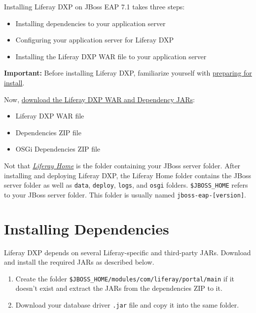 Installing Liferay DXP on JBoss EAP 7.1 takes three steps:

\begin{itemize}
\tightlist
\item
  Installing dependencies to your application server
\item
  Configuring your application server for Liferay DXP
\item
  Installing the Liferay DXP WAR file to your application server
\end{itemize}

\noindent\hrulefill

\textbf{Important:} Before installing Liferay DXP, familiarize yourself
with
\href{/docs/7-2/deploy/-/knowledge_base/d/preparing-for-install}{preparing
for install}.

\noindent\hrulefill

Now,
\href{/docs/7-2/deploy/-/knowledge_base/d/obtaining-product\#downloading-the-liferay-war-and-dependency-jars}{download
the Liferay DXP WAR and Dependency JARs}:

\begin{itemize}
\tightlist
\item
  Liferay DXP WAR file
\item
  Dependencies ZIP file
\item
  OSGi Dependencies ZIP file
\end{itemize}

Not that
\href{/docs/7-2/deploy/-/knowledge_base/d/liferay-home}{\emph{Liferay
Home}} is the folder containing your JBoss server folder. After
installing and deploying Liferay DXP, the Liferay Home folder contains
the JBoss server folder as well as \texttt{data}, \texttt{deploy},
\texttt{logs}, and \texttt{osgi} folders. \texttt{\$JBOSS\_HOME} refers
to your JBoss server folder. This folder is usually named
\texttt{jboss-eap-{[}version{]}}.

\section{Installing Dependencies}\label{installing-dependencies-2}

Liferay DXP depends on several Liferay-specific and third-party JARs.
Download and install the required JARs as described below.

\begin{enumerate}
\def\labelenumi{\arabic{enumi}.}
\item
  Create the folder
  \texttt{\$JBOSS\_HOME/modules/com/liferay/portal/main} if it doesn't
  exist and extract the JARs from the dependencies ZIP to it.
\item
  Download your database driver \texttt{.jar} file and copy it into the
  same folder.
\end{enumerate}

